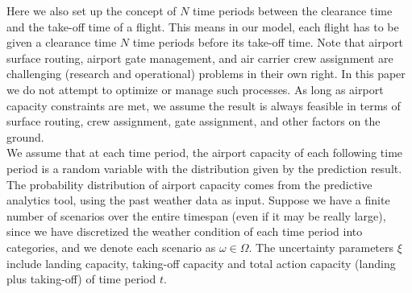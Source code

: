 \documentclass[12pt]{article}
\begin{document}
	\newline
	Here we also set up the concept of \(N\) time periods between the clearance time and the take-off time of a flight. This means in our model, each flight has to be given a clearance time \(N\) time periods before its take-off time. Note that airport surface routing, airport gate management, and air carrier crew assignment are challenging (research and operational) problems in their own right. In this paper we do not attempt to optimize or manage such processes. As long as airport capacity constraints are met, we assume the result is always feasible in terms of surface routing, crew assignment, gate assignment, and other factors on the ground.\\
	\newline %
	We assume that at each time period, the airport capacity of each following time period is a random variable with the distribution given by the prediction result. The probability distribution of airport capacity comes from the predictive analytics tool, using the past weather data as input. Suppose we have a finite number of scenarios over the entire timespan (even if it may be really large), since we have discretized the weather condition of each time period into categories, and we denote each scenario as \(\omega \in \Omega\). The uncertainty parameters \(\xi\) include landing capacity, taking-off capacity and total action capacity (landing plus taking-off) of time period \(t\).\\
	\newline %
\end{document}
